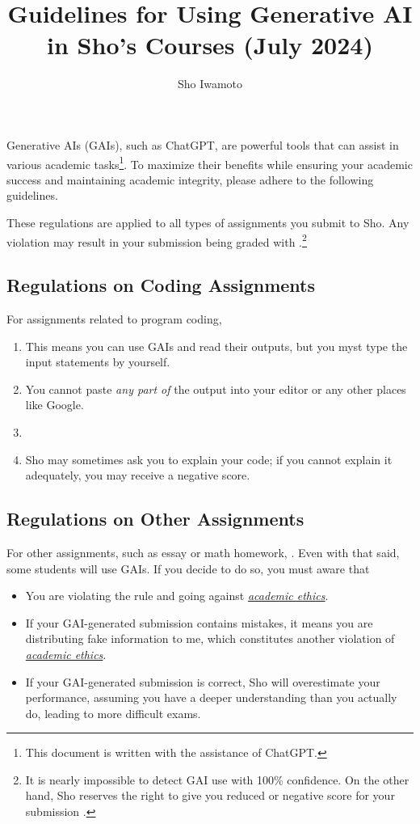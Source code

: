 \documentclass[11pt,pdfa,lastpage,minititle]{MishoNote}
\title{Guidelines for Using Generative AI in Sho's Courses (July 2024)}
\author{Sho Iwamoto}
\begin{document}
\maketitle
Generative AIs (GAIs), such as ChatGPT, are powerful tools that can assist in various academic tasks\footnote{This document is written with the assistance of ChatGPT.}.
To maximize their benefits while ensuring your academic success and maintaining academic integrity, please adhere to the following guidelines.

These regulations are applied to all types of assignments you submit to Sho.
Any violation may result in your submission being graded with .\footnote{%
  It is nearly impossible to detect GAI use with 100\% confidence. On the other hand, Sho reserves the right to give you reduced or negative score for your submission .
}

\subsection*{Regulations on Coding Assignments}
For assignments related to program coding,
\begin{enumerate}
  \item {}
        This means you can use GAIs and read their outputs, but you myst type the input statements by yourself.
  \item {}
        You cannot paste \emph{any part of} the output into your editor or any other places like Google.
  \item {}
  \item {}
  Sho may sometimes ask you to explain your code; if you cannot explain it adequately, you may receive a negative score.
\end{enumerate}
\subsection*{Regulations on Other Assignments}
For other assignments, such as essay or math homework, .
Even with that said, some students will use GAIs. If you decide to do so, you must aware that
\begin{itemize}
 \item You are violating the rule and going against \href{https://oaa.nsysu.edu.tw/var/file/3/1003/img/1296/acade_rule_27.pdf}{\em academic ethics}.
  \item If your GAI-generated submission contains mistakes, it means you are distributing fake information to me, which constitutes another violation of \href{https://oaa.nsysu.edu.tw/var/file/3/1003/img/1296/acade_rule_27.pdf}{\em academic ethics}.
  \item If your GAI-generated submission is correct, Sho will overestimate your performance, assuming you have a deeper understanding than you actually do, leading to more difficult exams.
\end{itemize}
\end{document}
